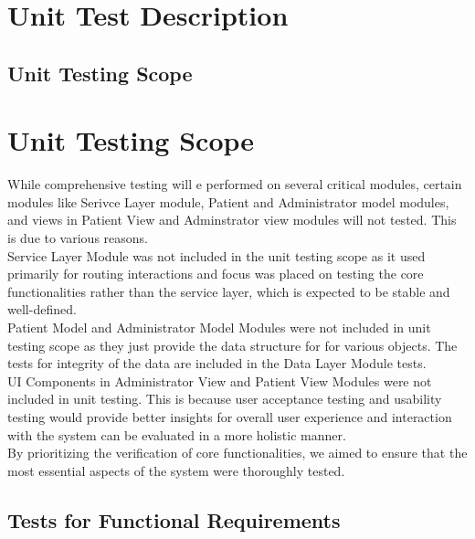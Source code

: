 \documentclass[12pt, titlepage]{article}
\begin{document}
\section {Unit Test Description}

\subsection{Unit Testing Scope}


\section{Unit Testing Scope}

 While comprehensive testing will e performed on several critical modules, certain modules like Serivce Layer module, Patient and Administrator model modules, and views in Patient View and Adminstrator view modules will not tested. This is due to various reasons.\\
 Service Layer Module was not included in the unit testing scope as it used primarily for routing interactions and focus was placed on testing the core functionalities rather than the service layer, which is expected to be stable and well-defined.\\
 Patient Model and Administrator Model Modules were not included in unit testing scope as they just provide the data structure for for various objects. The tests for integrity of the data are included in the Data Layer Module tests.\\
UI Components in Administrator View and Patient View Modules were not included in unit testing. This is because user acceptance testing and usability testing would provide better insights for overall user experience and interaction with the system can be evaluated in a more holistic manner.\\
By prioritizing the verification of core functionalities, we aimed to ensure that the most essential aspects of the system were thoroughly tested.

\subsection{Tests for Functional Requirements}
\end{document}
